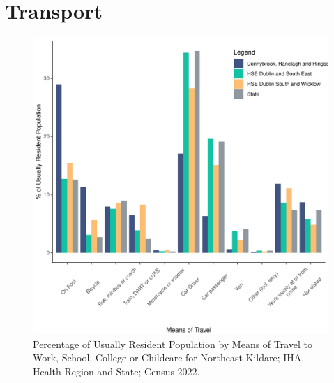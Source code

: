 \documentclass{article}
\begin{document}
\section{Transport}\label{sect:Trans}
\begin{figure}[H]
	\centering
	\includegraphics[width = 120mm]{../figures/TravelED.pdf}
	\caption{Percentage of Usually Resident Population by Means of Travel to Work, School, College or Childcare for Northeast Kildare; IHA, Health Region and State; Census 2022.}
	\label{fig:vbnv}
	\end{figure}
\end{document}
